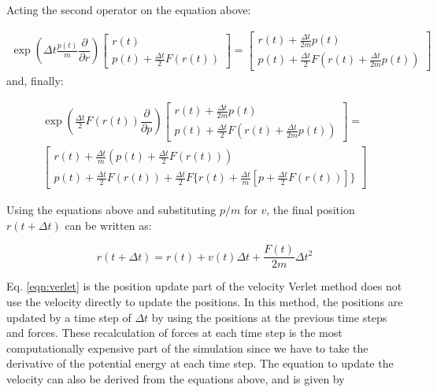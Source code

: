 Acting the second operator on the equation above:

\begin{equation}
\begin{aligned}
\exp \left( \Delta t \frac{p(t)}{m}\dfrac{\partial }{\partial r} \right)
\left[ \begin{array}{c} r(t) \\ p(t) + \frac{\Delta t}{2} F(r(t)) \end{array} \right] = 
\left[ \begin{array}{c} r(t) + \frac{\Delta t}{2m}p(t) \\ p(t) + \frac{\Delta t}{2} F(r(t) + \frac{\Delta t}{2m}p(t) ) \end{array} \right]
\end{aligned}
\end{equation}
and, finally:

\begin{equation}
\begin{aligned}
\exp \left (\frac{\Delta t}{2} F(r(t)) \dfrac{\partial}{\partial p} \right)
\left[ \begin{array}{c} r(t) + \frac{\Delta t}{2m}p(t) \\ p(t) + \frac{\Delta t}{2} F(r(t) + \frac{\Delta t}{2m}p(t) ) \end{array} \right]= \\ 
\left[ \begin{array}{c} r(t) + \frac{\Delta t}{m} (p(t)+\frac{\Delta t}{2} F(r(t))) \\ p(t) + \frac{\Delta t}{2} F(r(t)) + \frac{\Delta t}{2} F\{r(t)+ \frac{\Delta t}{m} [p + \frac{\Delta t}{2}F(r(t))]\}\end{array} \right]
\end{aligned}
\end{equation}

Using the equations above and substituting $p/m$ for $v$, the final position $r(t+\Delta t)$ can be written as:

\begin{equation}
r(t+ \Delta t) = r(t) +v(t) \Delta t + \frac{F(t)}{2m} \Delta t^{2}
\label{eqn:verlet}
\end{equation}

Eq.  \ref{eqn:verlet} is the position update part of the velocity Verlet method does not use the velocity directly to update the positions. In this method, the positions are updated by a time step of $\Delta t$ by using the positions at the previous time steps and forces. These recalculation of forces at each time step is the most computationally expensive part of the simulation since we have to take the derivative of the potential energy at each time step. The equation to update the velocity can also be derived from the equations above, and is given by

